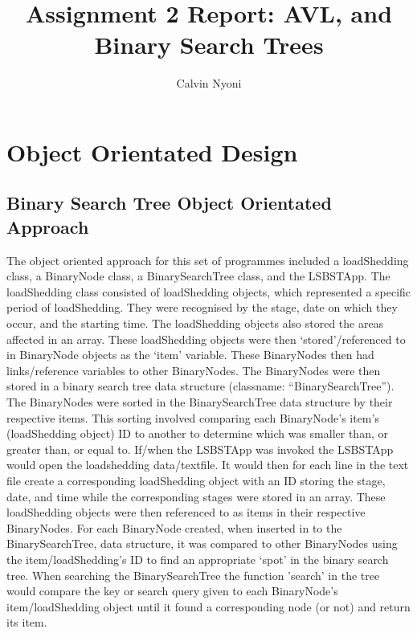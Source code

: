 \documentclass[10pt, a4paper]{article}
\begin{document}
    
    \title{Assignment 2 Report: AVL, and Binary Search Trees}
    \author{Calvin Nyoni}
    \maketitle

    \section{Object Orientated Design}
        \subsection{Binary Search Tree Object Orientated Approach}
        The object oriented approach for this set of programmes included a loadShedding class, a BinaryNode class,
        a BinarySearchTree class, and the LSBSTApp. The loadShedding class consisted of loadShedding objects, which
        represented a specific period of loadShedding. They were recognised by the stage, date on which they occur, and the
        starting time. The loadShedding objects also stored the areas affected in an array. These loadShedding objects
        were then ‘stored’/referenced to in BinaryNode objects as the ‘item’ variable. These BinaryNodes then had
        links/reference variables to other BinaryNodes. The BinaryNodes were then stored in a binary search tree data
        structure (classname: “BinarySearchTree”). The BinaryNodes were sorted in the BinarySearchTree data structure
        by their respective items. This sorting involved comparing each BinaryNode’s item’s (loadShedding object) ID to
        another to determine which was smaller than, or greater than, or equal to.
        \newline
        \newline
        If/when the LSBSTApp was invoked the LSBSTApp would open the loadshedding data/textfile. It would then for
        each line in the text file create a corresponding loadShedding object with an ID storing the stage, date, 
        and time while the corresponding stages were stored in an array. These loadShedding objects were then referenced
        to as items in their respective BinaryNodes. For each BinaryNode created, when inserted in to the BinarySearchTree, 
        data structure, it was compared to other BinaryNodes using the item/loadShedding's ID to find an appropriate 
        ‘spot’ in the binary search tree. When searching the BinarySearchTree the function 'search' in the tree 
        would compare the key or search query given to each BinaryNode’s item/loadShedding object until it found
        a corresponding node (or not) and return its item.
\end{document}
